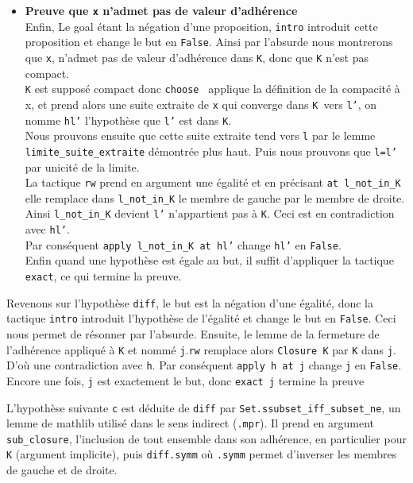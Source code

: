 \documentclass[a4paper, 12pt]{article}
\newcommand{\lean}[1]{\texttt{#1}}
\begin{document}
\begin{itemize}[itemsep=30pt]
    \item  \textbf{ Preuve que \lean{x} n'admet pas de valeur d'adhérence}\\
    Enfin, Le goal étant la négation d'une proposition, \lean{intro} introduit cette proposition et change le but en \lean{False}. Ainsi par l'absurde nous montrerons que \lean{x},
    n'admet pas de valeur d'adhérence dans \lean{K}, donc que \lean{K} n'est pas compact. \\
    \lean{K} est supposé compact donc \lean{choose } applique la définition de la compacité à x, et prend alors une suite extraite de \lean{x} qui converge dans \lean{K }vers \lean{l'},
    on nomme \lean{hl'} l'hypothèse que \lean{l'} est dans \lean{K}.\\
    Nous prouvons ensuite que cette suite extraite tend vers \lean{l} par le lemme \lean{limite_suite_extraite} démontrée plus haut. Puis nous prouvons que \lean{l=l'} par unicité de la
    limite.\\ 
    La tactique \lean{rw} prend en argument une égalité et en précisant \lean{at l_not_in_K } elle remplace dans \lean{l_not_in_K} le membre de gauche par le membre de droite. Ainsi
    \lean{l_not_in_K} devient \lean{l'} n'appartient pas à \lean{K}. Ceci est en contradiction avec \lean{hl'}.\\ 
    Par conséquent \lean{apply l_not_in_K at hl'} change \lean{hl'} en \lean{False}.\\
    Enfin quand une hypothèse est égale au but, il suffit d'appliquer la tactique \lean{exact}, ce qui termine la preuve.

\end{itemize}

\vspace{\baselineskip}
Revenons sur l'hypothèse \lean{diff}, le but est la négation d'une égalité, donc la tactique \lean{intro} introduit l'hypothèse de l'égalité et change le but en \lean{False}. Ceci nous permet de résonner par l'absurde. Ensuite, le lemme de la fermeture de l'adhérence appliqué à \lean{K} et nommé \lean{j}.\lean{rw} remplace alors \lean{Closure K} par \lean{K} dans \lean{j}. D'où une contradiction avec \lean{h}. Par conséquent \lean{apply h at j} change \lean{j} en \lean{False}. Encore une fois, \lean{j} est exactement le but, donc \lean{exact j} termine la preuve

L'hypothèse suivante \lean{c} est déduite de \lean{diff} par \lean{Set.ssubset_iff_subset_ne}, un lemme de mathlib utilisé dans le sens indirect (\lean{.mpr}). Il prend en argument \lean{sub_closure}, l'inclusion de tout ensemble dans son adhérence, en particulier pour \lean{K} (argument implicite), puis \lean{diff.symm} où \lean{.symm} permet d'inverser les membres de gauche et de droite.
\end{document}
